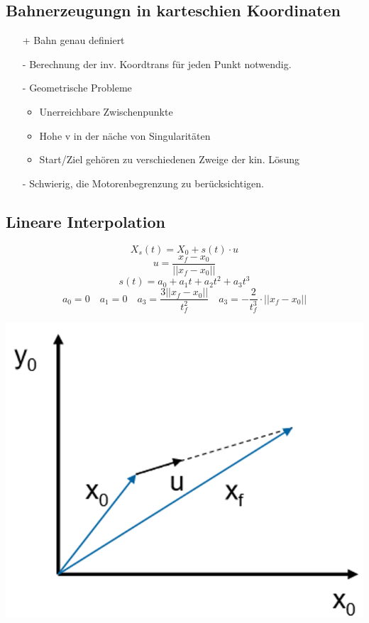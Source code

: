 \subsection{Bahnerzeugungn in karteschien Koordinaten}
\begin{multicols}{2}
    \begin{itemize}
        \item[+] Bahn genau definiert
    \end{itemize}
    
    \begin{itemize}
        \item[-] Berechnung der inv. Koordtrans für jeden Punkt notwendig.
        \item[-] Geometrische Probleme
        \begin{itemize}
            \item Unerreichbare Zwischenpunkte
            \item Hohe v in der näche von Singularitäten
            \item Start/Ziel gehören zu verschiedenen Zweige der kin. Lösung
        \end{itemize}
        \item[-] Schwierig, die Motorenbegrenzung zu berücksichtigen.
    \end{itemize}
\end{multicols}

\begin{minipage}{0.7\linewidth}
    \subsection{Lineare Interpolation}
    \vspace{-0.8cm}
    \[ X_s(t) = X_0 + s(t) \cdot u \]
    \[ u= \frac{x_f - x_0}{||x_f -x_0||} \]
    \[ s(t)=a_0 + a_1 t + a_2 t^2 +a_3t^3 \]
    \[ a_0=0 \quad a_1=0 \quad a_3=\frac{3||x_f-x_0||}{t_f^2} \quad a_3=-\frac{2}{t_f^3}\cdot ||x_f-x_0||  \]
\end{minipage}
\begin{minipage}{0.3\linewidth}
    \includegraphics[width=0.9\linewidth]{./bilder/LinInter}
\end{minipage}

